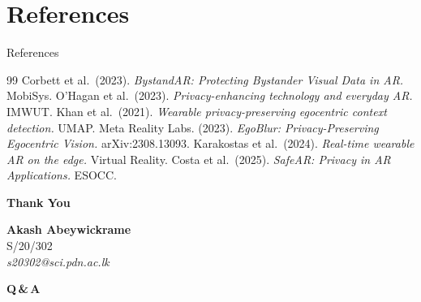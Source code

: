 \documentclass[aspectratio=169]{beamer}
\begin{document}
\section{References}
\begin{frame}[allowframebreaks]{References}
\footnotesize
\begin{thebibliography}{99}
      Corbett et al.\ (2023). \textit{BystandAR: Protecting Bystander Visual Data in AR.} MobiSys.
       O'Hagan et al.\ (2023). \textit{Privacy-enhancing technology and everyday AR.} IMWUT.
         Khan et al.\ (2021). \textit{Wearable privacy-preserving egocentric context detection.} UMAP.
         Meta Reality Labs. (2023). \textit{EgoBlur: Privacy-Preserving Egocentric Vision.} arXiv:2308.13093.
   Karakostas et al.\ (2024). \textit{Real-time wearable AR on the edge.} Virtual Reality.
        Costa et al.\ (2025). \textit{SafeAR: Privacy in AR Applications.} ESOCC.
\end{thebibliography}
\end{frame}

\begin{frame}
\centering
\vspace{1.0cm}
{\Huge \textbf{Thank You}}
\vspace{0.8cm}

\normalsize
\textbf{Akash Abeywickrame} \\ S/20/302 \\[0.2cm]
\textit{s20302@sci.pdn.ac.lk}
\vspace{0.8cm}

{\Large \textbf{Q\,\&\,A}}
\end{frame}
\end{document}
